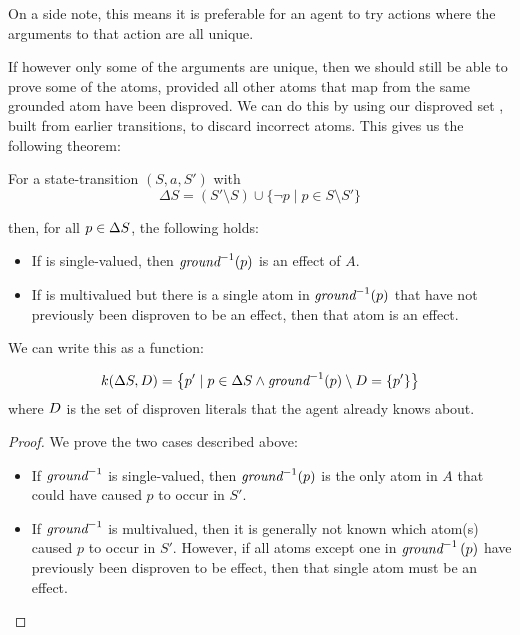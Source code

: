 \documentclass[../Master.tex]{subfiles}
\begin{document}
On a side note, this means it is preferable for an agent to try actions where the arguments to that action are all unique. 

If however only some of the arguments are unique, then we should still be able to prove some of the atoms, provided all other atoms that map from the same grounded atom have been disproved. We can do this by using our disproved set \Dsp, built from earlier transitions, to discard incorrect atoms. This gives us the following theorem: 

\begin{theorem}\label{thm:nca:prove-effects} For a state-transition $(S,a,S')$ with 
	\begin{equation*}
	\Delta S = \left(S' \setminus S\right) \cup \{\neg p \mid  p \in S \setminus S' \}
	\end{equation*}
	
	then, for all $p \in \Delta S$, the following holds:
	
    \begin{itemize}
        \item If \invground is single-valued, then $\textit{ground} ^{-1}(p)$ is an effect of $A$.
        \item If \invground is multivalued but there is a single atom in $\textit{ground} ^{-1}(p)$ that have not previously been disproven to be an effect, then that atom is an effect.
    \end{itemize}

	We can write this as a function:
	
	\begin{equation*}
	k(\Delta S,D) = 
	\left\{
		p' \mid 
				p \in \Delta S \land 
				\textit{ground} ^{-1}(p) \setminus D = \{p'\}
		\right\}
	\end{equation*}
	where $D$ is the set of disproven literals that the agent already knows about.
\end{theorem}
	
\begin{proof}
    We prove the two cases described above:
    \begin{itemize}
        \item If $\textit{ground} ^{-1}$ is single-valued, then $\textit{ground} ^{-1} (p)$ is the only atom in $A$ that could have caused $p$ to occur in $S'$.
        \item If $\textit{ground} ^{-1}$ is multivalued, then it is generally not known which atom(s) caused $p$ to occur in $S'$. However, if all atoms except one in $\textit{ground} ^{-1}\left( p \right)$ have previously been disproven to be effect, then that single atom must be an effect. 
    \end{itemize}
\end{proof}
\end{document}
